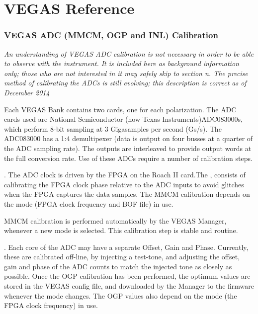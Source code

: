 \chapter{VEGAS Reference}\label{appendix:vegas_reference}

\subsection{VEGAS ADC (MMCM, OGP and INL) Calibration}\label{sec:vegas_adc_calibration}
{\it An understanding of VEGAS ADC calibration is not necessary in order 
to be able to observe with the instrument. It is included here as background 
information only; those who are not interested in it may safely skip to 
section n. The precise method of calibrating the ADCs is still evolving;
this description is correct as of December 2014}

Each VEGAS Bank contains two  cards, one
for each polarization. The \gls{ADC} cards used are National Semiconductor 
(now Texas Instruments)ADC083000s, which perform 8-bit sampling at 
3 Gigasamples per second (Gs/s). The ADC083000 has a 1:4 demultipexer (data
is output on four busses at a quarter of the \gls{ADC} sampling rate). The outputs
are interleaved to provide output words at the full conversion rate. Use of
these \glspl{ADC} require a number of calibration steps.

. The \gls{ADC} clock is driven by the
\gls{FPGA} on the Roach II card.The , consists of
calibrating the \gls{FPGA} clock phase relative to the \gls{ADC} inputs to
avoid glitches when the  \gls{FPGA} captures the data samples. The MMCM
calibration depends on the mode (\gls{FPGA} clock frequency and BOF file) in use.

MMCM calibration is performed automatically by the VEGAS Manager, whenever
a new mode is selected. This calibration step is stable and routine.

. Each core of the \gls{ADC} may have a
separate Offset, Gain and Phase. Currently, these are calibrated off-line, by
injecting a test-tone, and adjusting the offset, gain and phase of the
\gls{ADC} counts to match the injected tone as closely as possible. 
Once the OGP calibration has been performed, the optimum values
are stored in the VEGAS config file, and downloaded by the Manager to the
firmware whenever the mode changes.  The OGP values also depend on the mode 
(the \gls{FPGA} clock frequency) in use. 

